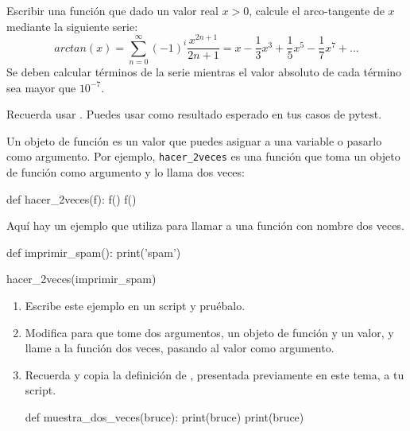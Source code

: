 \begin{ejercicio}
Escribir una función que dado un valor real $x > 0$, calcule el arco-tangente de $x$ mediante la siguiente serie:
$$arctan(x) = \sum_{n=0}^{\infty}(-1)^{i}\frac{x^{2n+1}}{2n+1}= x - \frac{1}{3}x^{3}+\frac{1}{5}x^{5}-\frac{1}{7}x^{7}+\dots$$
Se deben calcular términos de la serie mientras el valor absoluto de cada término sea mayor que $10^{-7}$.

Recuerda usar . Puedes usar  como resultado esperado en tus casos de pytest.
\end{ejercicio}



\begin{ejercicio}

Un objeto de función es un valor que puedes asignar a una variable o
pasarlo como argumento.  Por ejemplo, \verb"hacer_2veces" es una función
que toma un objeto de función como argumento y lo llama dos veces:

\begin{python}
def hacer_2veces(f):
    f()
    f()
\end{python}

Aquí hay un ejemplo que utiliza  para llamar a una función
con nombre  dos veces.

\begin{python}
def imprimir_spam():
    print('spam')

hacer_2veces(imprimir_spam)
\end{python}

\begin{enumerate}

\item Escribe este ejemplo en un script y pruébalo.

\item Modifica  para que tome dos argumentos, un
objeto de función y un valor, y llame a la función dos veces,
pasando al valor como argumento.

\item Recuerda y copia la definición de
, presentada previamente en este tema, a tu script.

\begin{python}[frame=single]
def muestra_dos_veces(bruce):
    print(bruce)
    print(bruce)
\end{python}



\end{enumerate}
\end{ejercicio}
